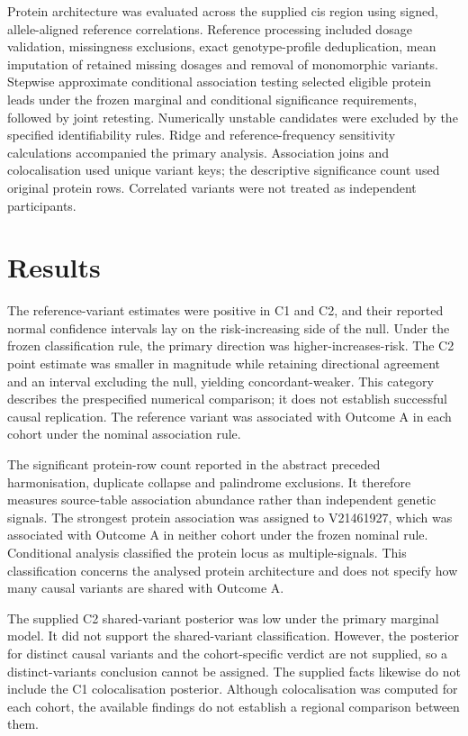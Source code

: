 \documentclass[10pt,a4paper]{article}
\begin{document}
\par
Protein architecture was evaluated across the supplied cis region using signed, allele-aligned reference correlations. Reference processing included dosage validation, missingness exclusions, exact genotype-profile deduplication, mean imputation of retained missing dosages and removal of monomorphic variants. Stepwise approximate conditional association testing selected eligible protein leads under the frozen marginal and conditional significance requirements, followed by joint retesting. Numerically unstable candidates were excluded by the specified identifiability rules. Ridge and reference-frequency sensitivity calculations accompanied the primary analysis. Association joins and colocalisation used unique variant keys; the descriptive significance count used original protein rows. Correlated variants were not treated as independent participants.
\par
\section*{Results}
The reference-variant estimates were positive in C1 and C2, and their reported normal confidence intervals lay on the risk-increasing side of the null. Under the frozen classification rule, the primary direction was higher-increases-risk. The C2 point estimate was smaller in magnitude while retaining directional agreement and an interval excluding the null, yielding concordant-weaker. This category describes the prespecified numerical comparison; it does not establish successful causal replication. The reference variant was associated with Outcome A in each cohort under the nominal association rule.
\par
The significant protein-row count reported in the abstract preceded harmonisation, duplicate collapse and palindrome exclusions. It therefore measures source-table association abundance rather than independent genetic signals. The strongest protein association was assigned to V21461927, which was associated with Outcome A in neither cohort under the frozen nominal rule. Conditional analysis classified the protein locus as multiple-signals. This classification concerns the analysed protein architecture and does not specify how many causal variants are shared with Outcome A.
\par
The supplied C2 shared-variant posterior was low under the primary marginal model. It did not support the shared-variant classification. However, the posterior for distinct causal variants and the cohort-specific verdict are not supplied, so a distinct-variants conclusion cannot be assigned. The supplied facts likewise do not include the C1 colocalisation posterior. Although colocalisation was computed for each cohort, the available findings do not establish a regional comparison between them.
\par
\end{document}
